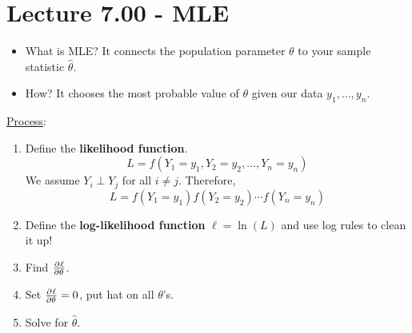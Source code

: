 \section{Lecture 7.00 - MLE}
\begin{itemize}
    \item What is MLE\@? It connects the population parameter $ \theta $
          to your sample statistic $ \hat{\theta} $.
    \item How? It chooses the most probable value of $ \theta $
          given our data $ y_1,\ldots,y_n $.
\end{itemize}
\underline{Process}:
\begin{enumerate}[(1)]
    \item Define the \textbf{likelihood function}.
          \[ L=f(Y_1=y_1,Y_2=y_2,\ldots,Y_n=y_n) \]
          We assume $ Y_i\perp Y_j $ for all $ i\ne j $. Therefore,
          \[ L=f(Y_1=y_1)f(Y_2=y_2)\cdots f(Y_n=y_n) \]
    \item Define the \textbf{log-likelihood function} $ \ell=\ln(L) $ and use log rules to
          clean it up!
    \item Find $ \pd{\ell}{\theta} $.
    \item Set $ \pd{\ell}{\theta}=0 $, put hat on all $ \theta $'s.
    \item Solve for $ \hat{\theta} $.
\end{enumerate}

